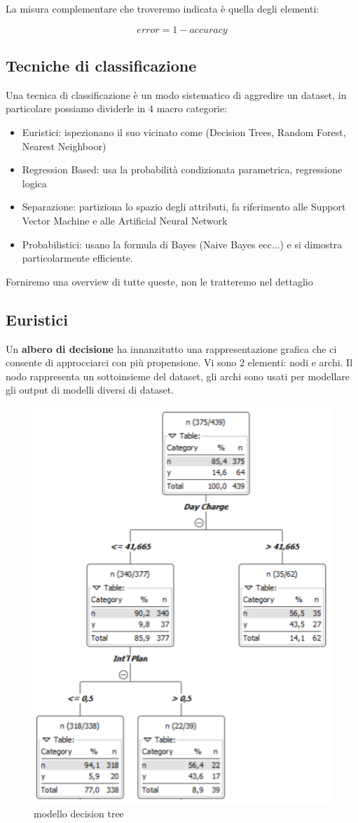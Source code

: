 La misura complementare che troveremo indicata è quella degli elementi:

\[error =  1 - accuracy\]

\subsection{Tecniche di classificazione}
Una tecnica di classificazione è un modo sistematico di aggredire un dataset, in particolare possiamo dividerle in 4 macro categorie:
\begin{itemize}
	\item Euristici: ispezionano il suo vicinato come (Decision Trees, Random Forest, Nearest Neighboor)
	\item Regression Based: usa la probabilità condizionata parametrica, regressione logica
	\item Separazione: partiziona lo spazio degli attributi, fa riferimento alle Support Vector Machine e alle Artificial Neural Network
	\item Probabilistici: usano la formula di Bayes (Naive Bayes ecc...) e si dimostra particolarmente efficiente.
\end{itemize}

Forniremo una overview di tutte queste, non le tratteremo nel dettaglio

\subsection{Euristici}

Un \textbf{albero di decisione} ha innanzitutto una rappresentazione grafica che ci consente di approcciarci con più propensione. Vi sono 2 elementi: nodi e archi. Il nodo rappresenta un sottoinsieme del dataset, gli archi sono usati per modellare gli output di modelli diversi di dataset.

\begin{figure}[h!]
	\centering
	\includegraphics[height=0.7 \linewidth]{pict/decision_tree.png}
	\caption{modello decision tree}
\end{figure}

